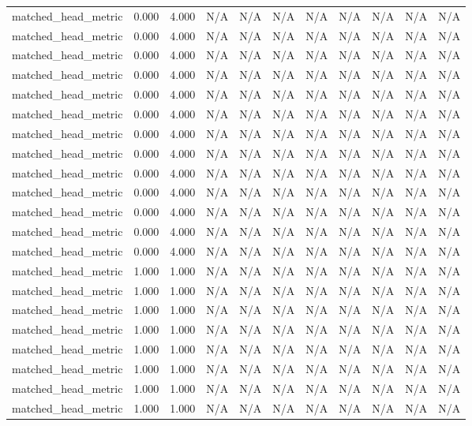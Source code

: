 \begin{table}[h!]
\begin{tabular}{lrrrrrrrrrr}
matched\_head\_metric & 0.000 & 4.000 & N/A & N/A & N/A & N/A & N/A & N/A & N/A & N/A \\
matched\_head\_metric & 0.000 & 4.000 & N/A & N/A & N/A & N/A & N/A & N/A & N/A & N/A \\
matched\_head\_metric & 0.000 & 4.000 & N/A & N/A & N/A & N/A & N/A & N/A & N/A & N/A \\
matched\_head\_metric & 0.000 & 4.000 & N/A & N/A & N/A & N/A & N/A & N/A & N/A & N/A \\
matched\_head\_metric & 0.000 & 4.000 & N/A & N/A & N/A & N/A & N/A & N/A & N/A & N/A \\
matched\_head\_metric & 0.000 & 4.000 & N/A & N/A & N/A & N/A & N/A & N/A & N/A & N/A \\
matched\_head\_metric & 0.000 & 4.000 & N/A & N/A & N/A & N/A & N/A & N/A & N/A & N/A \\
matched\_head\_metric & 0.000 & 4.000 & N/A & N/A & N/A & N/A & N/A & N/A & N/A & N/A \\
matched\_head\_metric & 0.000 & 4.000 & N/A & N/A & N/A & N/A & N/A & N/A & N/A & N/A \\
matched\_head\_metric & 0.000 & 4.000 & N/A & N/A & N/A & N/A & N/A & N/A & N/A & N/A \\
matched\_head\_metric & 0.000 & 4.000 & N/A & N/A & N/A & N/A & N/A & N/A & N/A & N/A \\
matched\_head\_metric & 0.000 & 4.000 & N/A & N/A & N/A & N/A & N/A & N/A & N/A & N/A \\
matched\_head\_metric & 0.000 & 4.000 & N/A & N/A & N/A & N/A & N/A & N/A & N/A & N/A \\
matched\_head\_metric & 1.000 & 1.000 & N/A & N/A & N/A & N/A & N/A & N/A & N/A & N/A \\
matched\_head\_metric & 1.000 & 1.000 & N/A & N/A & N/A & N/A & N/A & N/A & N/A & N/A \\
matched\_head\_metric & 1.000 & 1.000 & N/A & N/A & N/A & N/A & N/A & N/A & N/A & N/A \\
matched\_head\_metric & 1.000 & 1.000 & N/A & N/A & N/A & N/A & N/A & N/A & N/A & N/A \\
matched\_head\_metric & 1.000 & 1.000 & N/A & N/A & N/A & N/A & N/A & N/A & N/A & N/A \\
matched\_head\_metric & 1.000 & 1.000 & N/A & N/A & N/A & N/A & N/A & N/A & N/A & N/A \\
matched\_head\_metric & 1.000 & 1.000 & N/A & N/A & N/A & N/A & N/A & N/A & N/A & N/A \\
matched\_head\_metric & 1.000 & 1.000 & N/A & N/A & N/A & N/A & N/A & N/A & N/A & N/A \\

\end{tabular}
\end{table}
